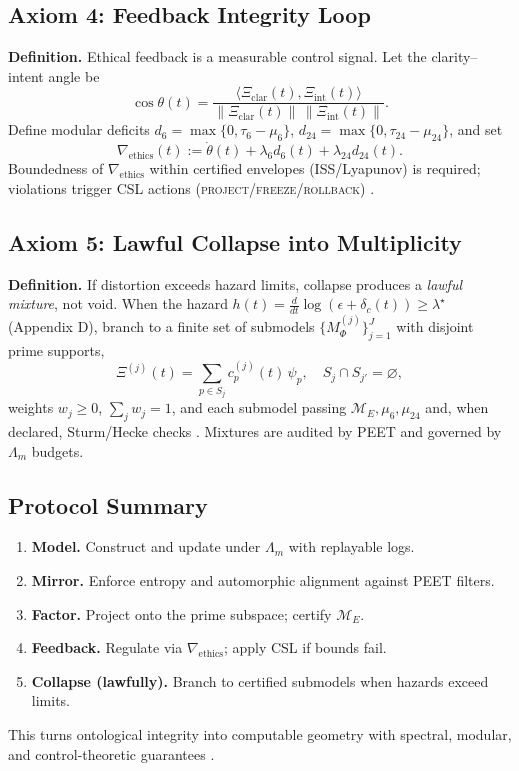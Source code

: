 \documentclass[12pt]{amsart}
\theoremstyle{plain}
\begin{document}
\subsection{Axiom 4: Feedback Integrity Loop}
\textbf{Definition.} Ethical feedback is a measurable control signal.
Let the clarity–intent angle be
\[
\cos\theta(t)=\frac{\langle \Xi_{\mathrm{clar}}(t),\Xi_{\mathrm{int}}(t)\rangle}{\|\Xi_{\mathrm{clar}}(t)\|\,\|\Xi_{\mathrm{int}}(t)\|}.
\]
Define modular deficits $d_6=\max\{0,\tau_6-\mu_6\}$, $d_{24}=\max\{0,\tau_{24}-\mu_{24}\}$, and set
\[
\nabla_{\!\text{ethics}}(t):=\dot{\theta}(t)+\lambda_6 d_6(t)+\lambda_{24} d_{24}(t).
\]
Boundedness of $\nabla_{\!\text{ethics}}$ within certified envelopes (ISS/Lyapunov) is required; violations trigger CSL actions (\textsc{project}/\textsc{freeze}/\textsc{rollback}) \cite{khalil2002nonlinear,schneider2000enforceable}.

\subsection{Axiom 5: Lawful Collapse into Multiplicity}
\textbf{Definition.} If distortion exceeds hazard limits, collapse produces a \emph{lawful mixture}, not void.
When the hazard $h(t)=\tfrac{d}{dt}\log(\epsilon+\delta_c(t))\ge \lambda^\star$ (Appendix D), branch to a finite set of submodels $\{M_{\Phi}^{(j)}\}_{j=1}^{J}$ with disjoint prime supports,
\[
\Xi^{(j)}(t)=\sum_{p\in S_j} c_p^{(j)}(t)\,\psi_p,\quad S_j\cap S_{j'}=\varnothing,
\]
weights $w_j\ge0$, $\sum_j w_j=1$, and each submodel passing $\mathcal{M}_E\!,\mu_6,\mu_{24}$ and, when declared, Sturm/Hecke checks \cite{sturm1987congruence,diamond2005first}. Mixtures are audited by PEET and governed by $\Lambda_m$ budgets.

\subsection*{Protocol Summary}
\begin{enumerate}
  \item \textbf{Model.} Construct and update under $\Lambda_m$ with replayable logs.
  \item \textbf{Mirror.} Enforce entropy and automorphic alignment against PEET filters.
  \item \textbf{Factor.} Project onto the prime subspace; certify $\mathcal{M}_E$.
  \item \textbf{Feedback.} Regulate via $\nabla_{\!\text{ethics}}$; apply CSL if bounds fail.
  \item \textbf{Collapse (lawfully).} Branch to certified submodels when hazards exceed limits.
\end{enumerate}
This turns ontological integrity into computable geometry with spectral, modular, and control-theoretic guarantees \cite{cover2006elements,sturm1987congruence,diamond2005first,khalil2002nonlinear,schneider2000enforceable,clarke1999model,baier2008model}.
\end{document}
